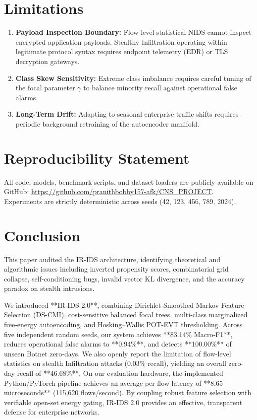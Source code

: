 \documentclass[10pt,journal,compsoc]{IEEEtran}
\begin{document}
\section{Limitations}
\begin{enumerate}
    \item \textbf{Payload Inspection Boundary:} Flow-level statistical NIDS cannot inspect encrypted application payloads. Stealthy Infiltration operating within legitimate protocol syntax requires endpoint telemetry (EDR) or TLS decryption gateways.
    \item \textbf{Class Skew Sensitivity:} Extreme class imbalance requires careful tuning of the focal parameter $\gamma$ to balance minority recall against operational false alarms.
    \item \textbf{Long-Term Drift:} Adapting to seasonal enterprise traffic shifts requires periodic background retraining of the autoencoder manifold.
\end{enumerate}

\section{Reproducibility Statement}
All code, models, benchmark scripts, and dataset loaders are publicly available on GitHub: \url{https://github.com/pranithbobby157-afk/CNS_PROJECT}. Experiments are strictly deterministic across seeds (42, 123, 456, 789, 2024).

\section{Conclusion}
This paper audited the IR-IDS architecture, identifying theoretical and algorithmic issues including inverted propensity scores, combinatorial grid collapse, self-conditioning bugs, invalid vector KL divergence, and the accuracy paradox on stealth intrusions.

We introduced **IR-IDS 2.0**, combining Dirichlet-Smoothed Markov Feature Selection (DS-CMI), cost-sensitive balanced focal trees, multi-class marginalized free-energy autoencoding, and Hosking--Wallis POT-EVT thresholding. Across five independent random seeds, our system achieves **83.14\% Macro-F1**, reduces operational false alarms to **0.94\%**, and detects **100.00\%** of unseen Botnet zero-days. We also openly report the limitation of flow-level statistics on stealth Infiltration attacks (0.03\% recall), yielding an overall zero-day recall of **46.68\%**. On our evaluation hardware, the implemented Python/PyTorch pipeline achieves an average per-flow latency of **8.65 microseconds** (115,620 flows/second). By coupling robust feature selection with verifiable open-set energy gating, IR-IDS 2.0 provides an effective, transparent defense for enterprise networks.



\end{document}
